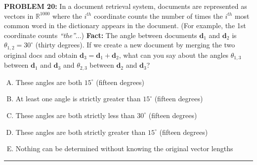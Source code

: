 \documentclass[12pt]{amsart}
\newcommand{\divider}{
  \vspace{-1em} %
  \noindent
  \raisebox{-0.15ex}{\textbullet}%
  \hspace{0.5em}%
  \rule[0.5ex]{0.95\textwidth}{1.0pt}%
  \hspace{0.5em}%
  \raisebox{-0.15ex}{\textbullet}%
  \vspace{0em} %
}
\begin{document}
{\bf PROBLEM 20:}
In a document retrieval system, documents are represented as vectors in $\mathbb{R}^{1000}$ 
where the $i^{th}$ coordinate counts the number of times the $i^{th}$ most common word in the dictionary appears in the document.
(For example, the 1st coordinate counts {\em ``the''}...) 
{\bf Fact:} The angle between documents $\mathbf{d}_1$ and $\mathbf{d}_2$ is $\theta_{1,2}=30^\circ$ (thirty degrees). 
If we create a new document by merging the two original docs and obtain $\mathbf{d}_3 = \mathbf{d}_1+\mathbf{d}_2$, 
what can you say about the angles $\theta_{1,3}$ between $\mathbf{d}_1$ and $\mathbf{d}_3$ and $\theta_{2,3}$ between $\mathbf{d}_2$ and $\mathbf{d}_3$?
%
\begin{enumerate}[(A)]
\item These angles are both $15^\circ$ (fifteen degrees)
\item At least one angle is strictly greater than $15^\circ$ (fifteen degrees)
\item These angles are both strictly less than $30^\circ$ (fifteen degrees)
\item These angles are both strictly greater than $15^\circ$ (fifteen degrees)
\item Nothing can be determined without knowing the original vector lengths
\end{enumerate}
%
%
\divider
\end{document}
